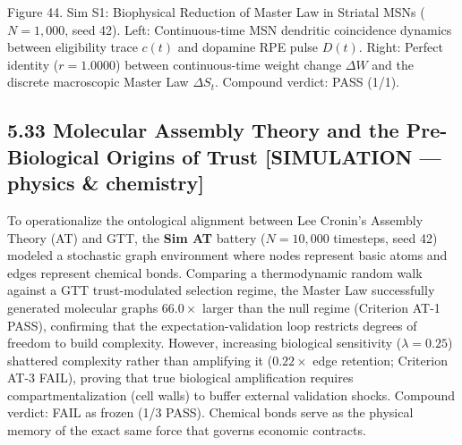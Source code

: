 \documentclass[
]{article}
\begin{document}
Figure 44. Sim S1: Biophysical Reduction of Master Law in Striatal MSNs
(\(N = 1,000\), seed 42). Left: Continuous-time MSN dendritic
coincidence dynamics between eligibility trace \(c(t)\) and dopamine RPE
pulse \(D(t)\). Right: Perfect identity (\(r = 1.0000\)) between
continuous-time weight change \(\Delta W\) and the discrete macroscopic
Master Law \(\Delta S_t\). Compound verdict: PASS (1/1).

\subsection{5.33 Molecular Assembly Theory and the Pre-Biological
Origins of Trust {[}SIMULATION --- physics \&
chemistry{]}}\label{molecular-assembly-theory-and-the-pre-biological-origins-of-trust-simulation-physics-chemistry}

To operationalize the ontological alignment between Lee Cronin's
Assembly Theory (AT) and GTT, the \textbf{Sim AT} battery
(\(N = 10,000\) timesteps, seed 42) modeled a stochastic graph
environment where nodes represent basic atoms and edges represent
chemical bonds. Comparing a thermodynamic random walk against a GTT
trust-modulated selection regime, the Master Law successfully generated
molecular graphs \(66.0\times\) larger than the null regime (Criterion
AT-1 PASS), confirming that the expectation-validation loop restricts
degrees of freedom to build complexity. However, increasing biological
sensitivity (\(\lambda = 0.25\)) shattered complexity rather than
amplifying it (\(0.22\times\) edge retention; Criterion AT-3 FAIL),
proving that true biological amplification requires compartmentalization
(cell walls) to buffer external validation shocks. Compound verdict:
FAIL as frozen (1/3 PASS). Chemical bonds serve as the physical memory
of the exact same force that governs economic contracts.
\end{document}

